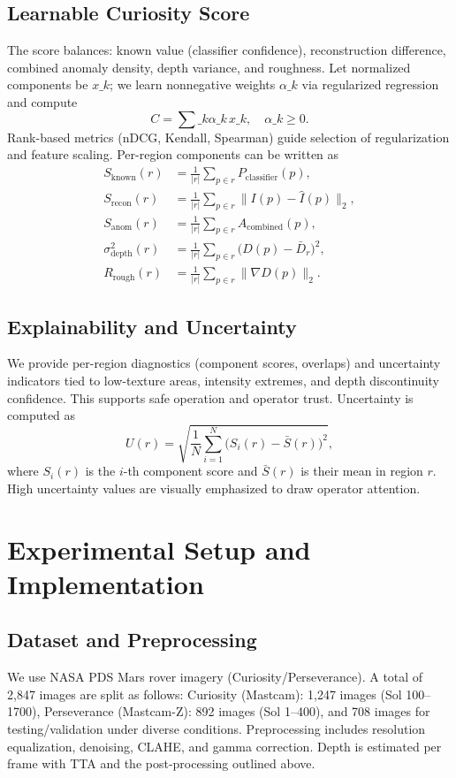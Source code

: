 \documentclass[12pt]{article}
\begin{document}
\subsection{Learnable Curiosity Score}
The score balances: known value (classifier confidence), reconstruction difference, combined anomaly density, depth variance, and roughness. Let normalized components be $x\_k$; we learn nonnegative weights $\alpha\_k$ via regularized regression and compute
\[ C = \sum\_k \alpha\_k\, x\_k, \quad \alpha\_k\ge 0. \]
Rank-based metrics (nDCG, Kendall, Spearman) guide selection of regularization and feature scaling.
Per-region components can be written as
\begin{align}
S_{\mathrm{known}}(r) &= \frac{1}{|r|} \sum_{p\in r} P_{\mathrm{classifier}}(p),\\
S_{\mathrm{recon}}(r) &= \frac{1}{|r|} \sum_{p\in r} \lVert I(p)-\hat I(p)\rVert_2,\\
S_{\mathrm{anom}}(r) &= \frac{1}{|r|} \sum_{p\in r} A_{\mathrm{combined}}(p),\\
\sigma^2_{\mathrm{depth}}(r) &= \frac{1}{|r|} \sum_{p\in r} \big(D(p)-\bar D_r\big)^2,\\
R_{\mathrm{rough}}(r) &= \frac{1}{|r|} \sum_{p\in r} \lVert \nabla D(p)\rVert_2.
\end{align}

\subsection{Explainability and Uncertainty}
We provide per-region diagnostics (component scores, overlaps) and uncertainty indicators tied to low-texture areas, intensity extremes, and depth discontinuity confidence. This supports safe operation and operator trust. Uncertainty is computed as
\[ U(r) = \sqrt{\frac{1}{N} \sum_{i=1}^{N} \big(S_i(r) - \bar{S}(r)\big)^2 } , \]
where $S_i(r)$ is the $i$-th component score and $\bar{S}(r)$ is their mean in region $r$. High uncertainty values are visually emphasized to draw operator attention.

\section{Experimental Setup and Implementation}
\subsection{Dataset and Preprocessing}
We use NASA PDS Mars rover imagery (Curiosity/Perseverance). A total of 2,847 images are split as follows: Curiosity (Mastcam): 1,247 images (Sol 100--1700), Perseverance (Mastcam-Z): 892 images (Sol 1--400), and 708 images for testing/validation under diverse conditions. Preprocessing includes resolution equalization, denoising, CLAHE, and gamma correction. Depth is estimated per frame with TTA and the post-processing outlined above.
\end{document}
